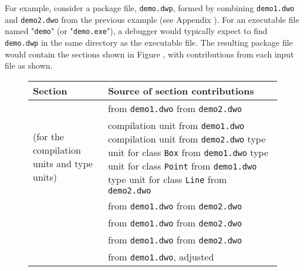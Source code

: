 For example, consider a package file, \texttt{demo.dwp}, formed by
combining \texttt{demo1.dwo} and \texttt{demo2.dwo} from the previous example
(see Appendix ). 
For an executable file named "\texttt{demo}" (or "\texttt{demo.exe}"), a debugger would
typically expect to find \texttt{demo.dwp} in the same directory as the
executable file.
The resulting package file would contain the sections shown in Figure
, 
with contributions from each input file as shown.

\begin{figure}[ht]
\begin{center}
\begin{tabular}{P{4.7cm}|P{8cm}}
\hline
\bfseries Section & \bfseries Source of section contributions \\
\hline
  \dotdebugabbrevdwo{}
&    \dotdebugabbrevdwo{} from \texttt{demo1.dwo} \newline
     \dotdebugabbrevdwo{} from \texttt{demo2.dwo} \\
\hline \newline
  \dotdebuginfodwo{} \newline (for the compilation units and type units)
&    compilation unit from \texttt{demo1.dwo} \newline
     compilation unit from \texttt{demo2.dwo} \newline
     type unit for class \texttt{Box} from \texttt{demo1.dwo}   \newline
     type unit for class \texttt{Point} from \texttt{demo1.dwo} \newline
     type unit for class \texttt{Line} from \texttt{demo2.dwo}  \\
\hline
  \dotdebugrnglistsdwo{} 
&    \dotdebugrnglistsdwo{} from \texttt{demo1.dwo} \newline
     \dotdebugrnglistsdwo{} from \texttt{demo2.dwo} \\
\hline
  \dotdebugloclistsdwo{}
&    \dotdebugloclistsdwo{} from \texttt{demo1.dwo} \newline
     \dotdebugloclistsdwo{} from \texttt{demo2.dwo} \\
\hline
  \dotdebuglinedwo{}
&    \dotdebuglinedwo{} from \texttt{demo1.dwo} \newline
     \dotdebuglinedwo{} from \texttt{demo2.dwo} \\
\hline
  \dotdebugstroffsetsdwo{}
&    \dotdebugstroffsetsdwo{} from \texttt{demo1.dwo}, \hspace*{6mm}adjusted \newline

\end{tabular}
\end{center}
\end{figure}
